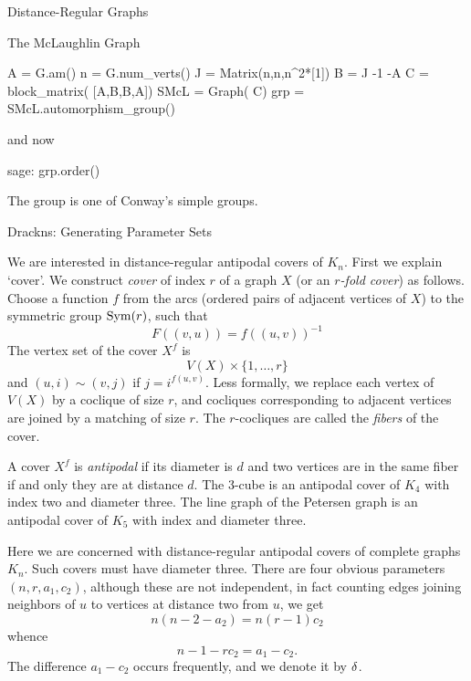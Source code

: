 \begin{chap}{Distance-Regular Graphs}
\begin{sect}{The McLaughlin Graph}
\begin{sageblock}
    A = G.am()
    n = G.num_verts()
    J = Matrix(n,n,n^2*[1])
    B = J -1 -A
    C = block_matrix( [A,B,B,A])
    SMcL = Graph( C)
    grp = SMcL.automorphism_group()
\end{sageblock}
%
\begin{para}
and now
\end{para}
%
\begin{sageexample}
sage: grp.order()
\end{sageexample}
\begin{para}
The group is one of Conway's simple groups.
\end{para}
%
\end{sect}
%
\begin{sect}{Drackns: Generating Parameter Sets}
%
\begin{para}
We are interested in distance-regular antipodal covers of $K_n$.
First we explain `cover'. We construct \textsl{cover} of
index $r$ of a graph $X$ (or an \textsl{$r$-fold cover})
as follows. Choose a function $f$ from the arcs (ordered pairs of adjacent
vertices of $X$) to the symmetric group $\operatorname{Sym}(r)$, such that
\[
    F((v,u)) =f((u,v))^{-1}
\]
The vertex set of the cover $X^f$ is 
\[
    V(X)\times \{1,\ldots,r\}
\]
and $(u,i)\sim (v,j)$ if $j = i^{f(u,v)}$. Less formally, we replace each
vertex of $V(X)$ by a coclique of size $r$, and cocliques corresponding
to adjacent vertices are joined by a matching of size $r$. The $r$-cocliques
are called the \textsl{fibers} of the cover.
\end{para}
%
\begin{para}
A cover $X^f$ is \textsl{antipodal} if its diameter is $d$ and two vertices
are in the same fiber if and only they are at distance $d$. The 3-cube is an antipodal
cover of $K_4$ with index two and diameter three. The line graph of the Petersen
graph is an antipodal cover of $K_5$ with index and diameter three.
\end{para}
%
\begin{para}
Here we are concerned with distance-regular antipodal covers of complete graphs $K_n$.
Such covers must have diameter three. There are four obvious parameters $(n,r,a_1,c_2)$,
although these are not independent, in fact counting edges joining neighbors
of $u$ to vertices at distance two from $u$, we get
\[
    n(n-2-a_2) = n(r-1)c_2
\]
whence
\begin{equation}
\label{eq:n1rc2}
    n-1-rc_2 = a_1-c_2.
\end{equation}
The difference $a_1-c_2$ occurs frequently, and we denote it by $\delta$.

\end{para}
\end{sect}
\end{chap}
